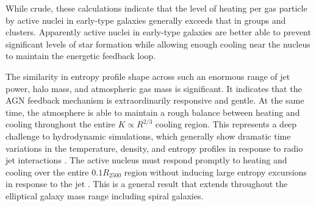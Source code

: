 \documentclass[apjl]{emulateapj}
\begin{document}
While crude, these calculations indicate that the level of heating per gas particle by active nuclei in early-type galaxies generally exceeds that in groups and clusters.  Apparently active nuclei in early-type galaxies are better able to prevent significant levels of star formation while allowing enough cooling near the nucleus to maintain the energetic feedback loop.

The similarity in entropy profile shape across such an enormous range of jet power, halo mass, and atmospheric gas mass is significant.  It indicates that the AGN feedback mechanism is extraordinarily responsive and gentle.  At the same time, the atmosphere is able to maintain a rough balance between heating and cooling throughout the entire $K\propto R^{2/3}$ cooling region. This represents a deep challenge to hydrodynamic simulations, which generally show dramatic time variations in the temperature, density, and entropy profiles in response to radio jet interactions \citep{Gaspari:12, Sijacki:11}. The active nucleus must respond promptly to heating and cooling over the entire $0.1R_{2500}$ region without inducing large entropy excursions in response to the jet \citep{Gaspari:12, Sijacki:11, Weinberger:17}. This is a general result that extends throughout the elliptical galaxy mass range including spiral galaxies.  


\end{document}
